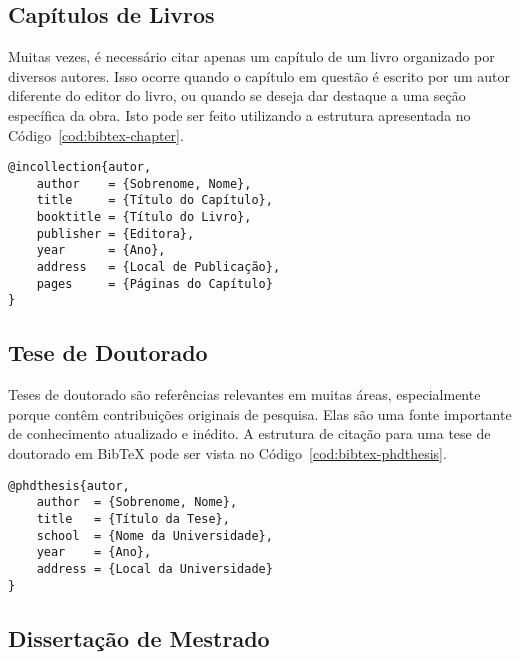 \documentclass[
    12pt
    ,oneside
    ,a4paper
    ,chapter=TITLE
    ,section=TITLE
    ,sumario=abnt-6027-2012]{abntex2}
\begin{document}
\subsection{Capítulos de Livros}

Muitas vezes, é necessário citar apenas um capítulo de um livro organizado por diversos autores. Isso ocorre quando o capítulo em questão é escrito por um autor diferente do editor do livro, ou quando se deseja dar destaque a uma seção específica da obra. Isto pode ser feito utilizando a estrutura apresentada no Código~\ref{cod:bibtex-chapter}.

\begin{codigo}[htb]
\begin{lstlisting}
@incollection{autor,
    author    = {Sobrenome, Nome},
    title     = {Título do Capítulo},
    booktitle = {Título do Livro},
    publisher = {Editora},
    year      = {Ano},
    address   = {Local de Publicação},
    pages     = {Páginas do Capítulo}
}
\end{lstlisting}
\fonteautor
\end{codigo}

\subsection{Tese de Doutorado}

Teses de doutorado são referências relevantes em muitas áreas, especialmente porque contêm contribuições originais de pesquisa. Elas são uma fonte importante de conhecimento atualizado e inédito. A estrutura de citação para uma tese de doutorado em BibTeX pode ser vista no Código~\ref{cod:bibtex-phdthesis}.

\begin{codigo}[htb]
\begin{lstlisting}
@phdthesis{autor,
    author  = {Sobrenome, Nome},
    title   = {Título da Tese},
    school  = {Nome da Universidade},
    year    = {Ano},
    address = {Local da Universidade}
}
\end{lstlisting}
\fonteautor
\end{codigo}

\subsection{Dissertação de Mestrado}
\end{document}
